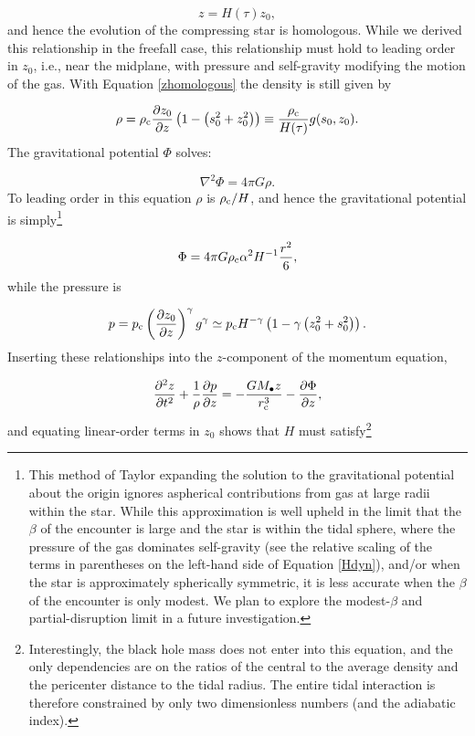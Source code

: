 \documentclass[twocolumn]{aastex62}
\begin{document}
\begin{equation}
z = H(\tau)z_0, \label{zhomologous}
\end{equation}
and hence the evolution of the compressing star is homologous. While we derived this relationship in the freefall case, this relationship must hold {to leading order in $z_0$}, i.e., near the midplane, with pressure and self-gravity modifying the motion of the gas. With Equation \eqref{zhomologous} the density is still given by

\begin{equation}
\rho = \rho_{\rm c}\frac{\partial z_0}{\partial z}\left(1-\left({s_0^2+z_0^2}\right)\right) \equiv \frac{\rho_{\rm c}}{H(\tau)}g(s_0,z_0).
\end{equation}
The gravitational potential $\Phi$ solves:

\begin{equation}
\nabla^2\Phi = 4\pi G\rho.
\end{equation}
To leading order in this equation $\rho$ is $\rho_{\rm c}/H$, and hence the gravitational potential is simply\footnote{This method of Taylor expanding the solution to the gravitational potential about the origin ignores aspherical contributions from gas at large radii within the star. While this approximation is well upheld in the limit that the $\beta$ of the encounter is large and the star is within the tidal sphere, where the pressure of the gas dominates self-gravity (see the relative scaling of the terms in parentheses on the left-hand side of Equation \ref{Hdyn}), and/or when the star is approximately spherically symmetric, it is less accurate when the $\beta$ of the encounter is only modest. We plan to explore the modest-$\beta$ and partial-disruption limit in a future investigation.} 

\begin{equation}
\Phi = 4\pi G\rho_{\rm c}\alpha^2H^{-1}\frac{r^2}{6} \label{phisimp}, 
\end{equation}
while the pressure is

\begin{equation}
p = p_{\rm c}\left(\frac{\partial z_0}{\partial z}\right)^{\gamma}g^{\gamma} \simeq p_{\rm c}H^{-\gamma}\left(1-\gamma\left({z_0^2+s_0^2}\right)\right).
\end{equation}
Inserting these relationships into the $z$-component of the momentum equation,

\begin{equation}
\frac{\partial^2z}{\partial t^2}+\frac{1}{\rho}\frac{\partial p}{\partial z} = -\frac{GM_{\bullet}z}{r_{\rm c}^3}-\frac{\partial \Phi}{\partial z}, \label{zmom}
\end{equation}
and equating linear-order terms in $z_0$ shows that $H$ must satisfy\footnote{\label{footnote:2}Interestingly, the black hole mass does not enter into this equation, and the only dependencies are on the ratios of the central to the average density and the pericenter distance to the tidal radius. The entire tidal interaction is therefore constrained by only two dimensionless numbers (and the adiabatic index).}
\end{document}
